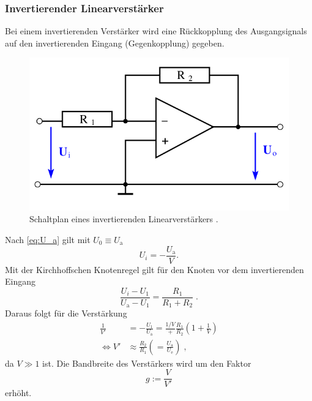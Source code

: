 \subsubsection{Invertierender Linearverstärker}
Bei einem invertierenden Verstärker wird eine Rückkopplung des Ausgangsignals auf den invertierenden Eingang (Gegenkopplung) gegeben.
\begin{figure}
    \centering
    \includegraphics[width = .5\textwidth]{"content/pics/inverting.png"}
    \caption{Schaltplan eines invertierenden Linearverstärkers \cite{v51}.}
    \label{fig:inverting}
\end{figure}
Nach \autoref{eq:U_a} gilt mit $U_0 \equiv U_\text{a}$ 
\begin{equation*}
U_i = -\frac{U_\text{a}}{V}.
\end{equation*}
Mit der Kirchhoffschen Knotenregel gilt für den Knoten vor dem invertierenden Eingang 
\begin{equation*}
    \frac{U_i - U_1}{U_\text{a} - U_1} = \frac{R_1}{R_1 + R_2}\;.
\end{equation*}
Daraus folgt für die Verstärkung 
\begin{align}
    \frac{1}{V'} &= -\frac{U_1}{U_\text{a}} = \frac{1/V} + \frac{R_1}{R_2}\left(1 + \frac{1}{V}\right) \nonumber \\
    \Leftrightarrow V' &\approx \frac{R_2}{R_1} \left( = \frac{U_\text{a}}{U_\text{e}}\right) \;,
    \label{eq:invert}
\end{align}
da $V \gg 1$ ist.
Die Bandbreite des Verstärkers wird um den Faktor 
\begin{equation}
    g := \frac{V}{V'}
\end{equation}
erhöht.

